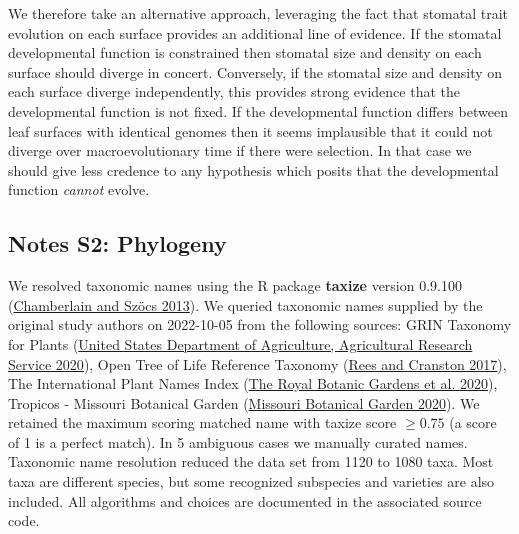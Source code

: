 \documentclass[
  12pt,
]{article}
\begin{document}
We therefore take an alternative approach, leveraging the fact that stomatal trait evolution on each surface provides an additional line of evidence. If the stomatal developmental function is constrained then stomatal size and density on each surface should diverge in concert. Conversely, if the stomatal size and density on each surface diverge independently, this provides strong evidence that the developmental function is not fixed. If the developmental function differs between leaf surfaces with identical genomes then it seems implausible that it could not diverge over macroevolutionary time if there were selection. In that case we should give less credence to any hypothesis which posits that the developmental function \emph{cannot} evolve.

\clearpage

\hypertarget{notes-s2-phylogeny}{%
\subsection{Notes S2: Phylogeny}\label{notes-s2-phylogeny}}

We resolved taxonomic names using the R package \textbf{taxize} version 0.9.100 (\protect\hyperlink{ref-chamberlain_taxize_2013}{Chamberlain and Szöcs 2013}). We queried taxonomic names supplied by the original study authors on 2022-10-05 from the following sources: GRIN Taxonomy for Plants (\protect\hyperlink{ref-united_states_department_of_agriculture_agricultural_research_service_germplasm_2020}{United States Department of Agriculture, Agricultural Research Service 2020}), Open Tree of Life Reference Taxonomy (\protect\hyperlink{ref-rees_automated_2017}{Rees and Cranston 2017}), The International Plant Names Index (\protect\hyperlink{ref-the_royal_botanic_gardens_international_2020}{The Royal Botanic Gardens et al. 2020}), Tropicos - Missouri Botanical Garden (\protect\hyperlink{ref-missouri_botanical_garden_tropicos_2020}{Missouri Botanical Garden 2020}). We retained the maximum scoring matched name with taxize score \(\ge 0.75\) (a score of 1 is a perfect match). In 5 ambiguous cases we manually curated names. Taxonomic name resolution reduced the data set from 1120 to 1080 taxa. Most taxa are different species, but some recognized subspecies and varieties are also included. All algorithms and choices are documented in the associated source code.
\end{document}
